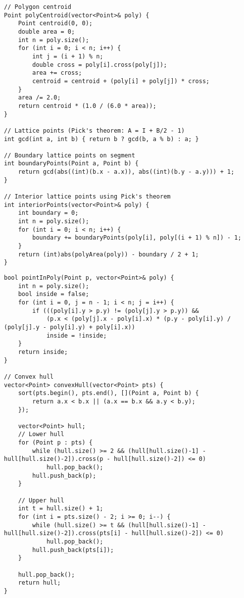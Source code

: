 \documentclass[11pt,a4paper]{article}
\begin{document}
\newpage

\begin{lstlisting}[caption={Polygon Centroid and Lattice Points}]
// Polygon centroid
Point polyCentroid(vector<Point>& poly) {
    Point centroid(0, 0);
    double area = 0;
    int n = poly.size();
    for (int i = 0; i < n; i++) {
        int j = (i + 1) % n;
        double cross = poly[i].cross(poly[j]);
        area += cross;
        centroid = centroid + (poly[i] + poly[j]) * cross;
    }
    area /= 2.0;
    return centroid * (1.0 / (6.0 * area));
}

// Lattice points (Pick's theorem: A = I + B/2 - 1)
int gcd(int a, int b) { return b ? gcd(b, a % b) : a; }

// Boundary lattice points on segment
int boundaryPoints(Point a, Point b) {
    return gcd(abs((int)(b.x - a.x)), abs((int)(b.y - a.y))) + 1;
}

// Interior lattice points using Pick's theorem
int interiorPoints(vector<Point>& poly) {
    int boundary = 0;
    int n = poly.size();
    for (int i = 0; i < n; i++) {
        boundary += boundaryPoints(poly[i], poly[(i + 1) % n]) - 1;
    }
    return (int)abs(polyArea(poly)) - boundary / 2 + 1;
}
\end{lstlisting}

\newpage

\begin{lstlisting}[caption={Point in Polygon and Convex Hull}]
bool pointInPoly(Point p, vector<Point>& poly) {
    int n = poly.size();
    bool inside = false;
    for (int i = 0, j = n - 1; i < n; j = i++) {
        if (((poly[i].y > p.y) != (poly[j].y > p.y)) &&
            (p.x < (poly[j].x - poly[i].x) * (p.y - poly[i].y) / (poly[j].y - poly[i].y) + poly[i].x))
            inside = !inside;
    }
    return inside;
}

// Convex hull
vector<Point> convexHull(vector<Point> pts) {
    sort(pts.begin(), pts.end(), [](Point a, Point b) { 
        return a.x < b.x || (a.x == b.x && a.y < b.y); 
    });
    
    vector<Point> hull;
    // Lower hull
    for (Point p : pts) {
        while (hull.size() >= 2 && (hull[hull.size()-1] - hull[hull.size()-2]).cross(p - hull[hull.size()-2]) <= 0)
            hull.pop_back();
        hull.push_back(p);
    }
    
    // Upper hull
    int t = hull.size() + 1;
    for (int i = pts.size() - 2; i >= 0; i--) {
        while (hull.size() >= t && (hull[hull.size()-1] - hull[hull.size()-2]).cross(pts[i] - hull[hull.size()-2]) <= 0)
            hull.pop_back();
        hull.push_back(pts[i]);
    }
    
    hull.pop_back();
    return hull;
}
\end{lstlisting}
\end{document}
